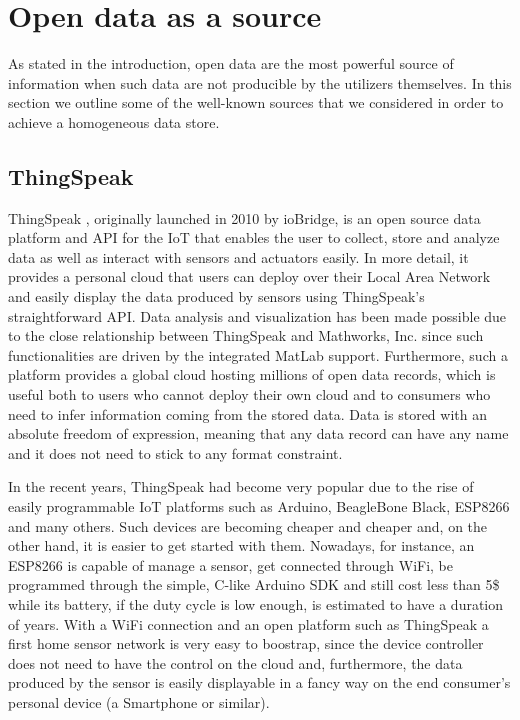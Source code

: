 \documentclass[conference]{IEEEtran}
\begin{document}
\section{Open data as a source}

As stated in the introduction, open data are the most powerful source of information when such data are not producible by the utilizers themselves.
In this section we outline some of the well-known sources that we considered in order to achieve a homogeneous data store.

\subsection*{ThingSpeak}
ThingSpeak \cite{thingspeak}, originally launched in 2010 by ioBridge, is an open source data platform and API for the IoT that enables the user to collect, store and analyze data as well as interact with sensors and actuators easily.
In more detail, it provides a personal cloud that users can deploy over their Local Area Network and easily display the data produced by sensors using ThingSpeak's straightforward API.
Data analysis and visualization has been made possible due to the close relationship between ThingSpeak and Mathworks, Inc. since such functionalities are driven by the integrated MatLab support. 
Furthermore, such a platform provides a global cloud hosting millions of open data records, which is useful both to users who cannot deploy their own cloud and to consumers who need to infer information coming from the stored data.
Data is stored with an absolute freedom of expression, meaning that any data record can have any name and it does not need to stick to any format constraint.

In the recent years, ThingSpeak had become very popular due to the rise of easily programmable IoT platforms such as Arduino, BeagleBone Black, ESP8266 and many others.
Such devices are becoming cheaper and cheaper and, on the other hand, it is easier to get started with them.
Nowadays, for instance, an ESP8266 is capable of manage a sensor, get connected through WiFi, be programmed through the simple, C-like Arduino SDK and still cost less than 5\$ while its battery, if the duty cycle is low enough, is estimated to have a duration of years.
With a WiFi connection and an open platform such as ThingSpeak a first home sensor network is very easy to boostrap, since the device controller does not need to have the control on the cloud and, furthermore, the data produced by the sensor is easily displayable in a fancy way on the end consumer's personal device (a Smartphone or similar).
\end{document}
